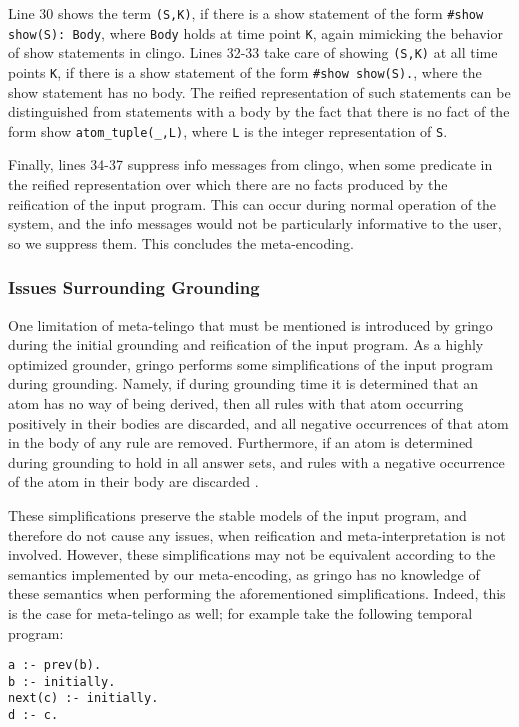 Line 30 shows the term \verb|(S,K)|, if there is a show statement of
the form \verb|#show show(S): Body|, where \verb|Body| holds at time
point \verb|K|, again mimicking the behavior of show statements in
clingo. Lines 32-33 take care of showing \verb|(S,K)| at all time
points \verb|K|, if there is a show statement of the form
\verb|#show show(S).|, where the show statement has no body. The
reified representation of such statements can be distinguished from
statements with a body by the fact that there is no fact of the form
show \verb|atom_tuple(_,L)|, where \verb|L| is the integer
representation of \verb|S|.

Finally, lines 34-37 suppress info messages from clingo, when some
predicate in the reified representation over which there are no facts
produced by the reification of the input program. This can occur
during normal operation of the system, and the info messages would not
be particularly informative to the user, so we suppress them. This
concludes the meta-encoding.

\subsubsection{Issues Surrounding Grounding}

One limitation of meta-telingo that must be mentioned is introduced by
gringo during the initial grounding and reification of the input
program. As a highly optimized grounder, gringo performs some
simplifications of the input program during grounding. Namely, if
during grounding time it is determined that an atom has no way of
being derived, then all rules with that atom occurring positively in
their bodies are discarded, and all negative occurrences of that atom
in the body of any rule are removed. Furthermore, if an atom is
determined during grounding to hold in all answer sets, and rules with
a negative occurrence of the atom in their body are discarded \cite{gekakasc12a}.

These simplifications preserve the stable models of the input program,
and therefore do not cause any issues, when reification and
meta-interpretation is not involved. However, these simplifications
may not be equivalent according to the semantics implemented by our
meta-encoding, as gringo has no knowledge of these semantics when
performing the aforementioned simplifications. Indeed, this is the
case for meta-telingo as well; for example take the following temporal
program:

\begin{lstlisting}[language=clingo]
a :- prev(b).
b :- initially.
next(c) :- initially.
d :- c.
\end{lstlisting}

